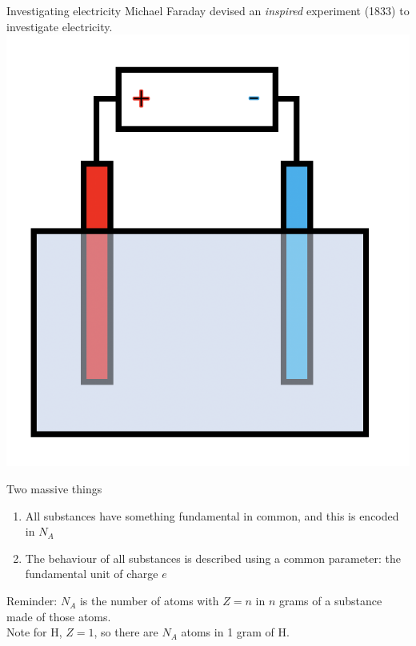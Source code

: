 \begin{frame}{Investigating electricity}
\small
Michael Faraday devised an \textit{inspired} experiment (1833) to investigate electricity.\\


\includegraphics[scale=0.4]{electrolysis}
\end{frame}


\begin{frame}{Two massive things}
\small
\vspace{2cm}
\begin{enumerate}
\item All substances have something fundamental in common, and this is encoded in $N_A$
\item The behaviour of all substances is described using a common parameter: the fundamental unit of charge $e$
\end{enumerate}
\vspace{2cm}

\tiny
Reminder: $N_A $ is the number of atoms with $Z=n$ in $n$ grams of a substance made of those atoms. \\
Note for H, $Z=1$, so there are $N_A$ atoms in 1 gram of H.
\end{frame}

